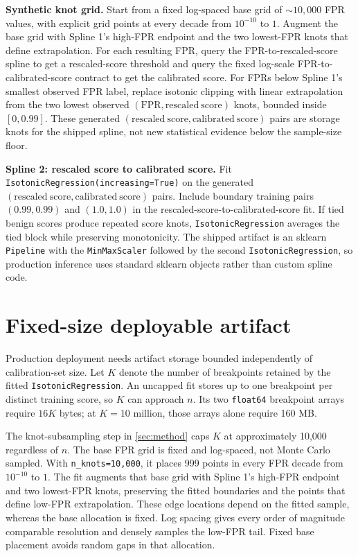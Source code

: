 \documentclass{article}
\begin{document}
\textbf{Synthetic knot grid.}
Start from a fixed log-spaced base grid of $\sim 10{,}000$ FPR values, with explicit grid points at every decade from $10^{-10}$ to $1$.
Augment the base grid with Spline 1's high-FPR endpoint and the two lowest-FPR knots that define extrapolation.
For each resulting FPR, query the FPR-to-rescaled-score spline to get a rescaled-score threshold and query the fixed log-scale FPR-to-calibrated-score contract to get the calibrated score.
For FPRs below Spline 1's smallest observed FPR label, replace isotonic clipping with linear extrapolation from the two lowest observed $(\mathrm{FPR}, \mathrm{rescaled\ score})$ knots, bounded inside $[0, 0.99]$.
These generated $(\mathrm{rescaled\ score}, \mathrm{calibrated\ score})$ pairs are storage knots for the shipped spline, not new statistical evidence below the sample-size floor.

\textbf{Spline 2: rescaled score to calibrated score.}
Fit \texttt{IsotonicRegression(increasing=True)} on the generated $(\mathrm{rescaled\ score}, \mathrm{calibrated\ score})$ pairs.
Include boundary training pairs $(0.99,0.99)$ and $(1.0,1.0)$ in the rescaled-score-to-calibrated-score fit.
If tied benign scores produce repeated score knots, \texttt{IsotonicRegression} averages the tied block while preserving monotonicity.
The shipped artifact is an sklearn \texttt{Pipeline} with the \texttt{MinMaxScaler} followed by the second \texttt{IsotonicRegression}, so production inference uses standard sklearn objects rather than custom spline code.

\section{Fixed-size deployable artifact}
\label{sec:artifact}

Production deployment needs artifact storage bounded independently of calibration-set size.
Let $K$ denote the number of breakpoints retained by the fitted \texttt{IsotonicRegression}.
An uncapped fit stores up to one breakpoint per distinct training score, so $K$ can approach $n$.
Its two \texttt{float64} breakpoint arrays require $16K$ bytes; at $K=10$ million, those arrays alone require 160 MB.

The knot-subsampling step in \cref{sec:method} caps $K$ at approximately 10{,}000 regardless of $n$.
The base FPR grid is fixed and log-spaced, not Monte Carlo sampled.
With \texttt{n\_knots=10{,}000}, it places 999 points in every FPR decade from $10^{-10}$ to $1$.
The fit augments that base grid with Spline 1's high-FPR endpoint and two lowest-FPR knots, preserving the fitted boundaries and the points that define low-FPR extrapolation.
These edge locations depend on the fitted sample, whereas the base allocation is fixed.
Log spacing gives every order of magnitude comparable resolution and densely samples the low-FPR tail.
Fixed base placement avoids random gaps in that allocation.
\end{document}
